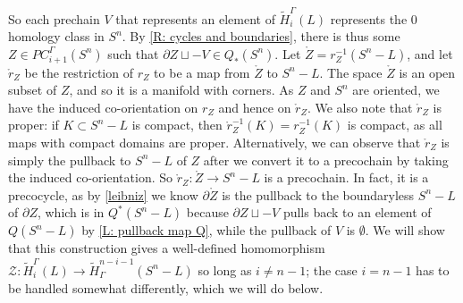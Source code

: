 \documentclass[12pt]{article}
\theoremstyle{plain}
\theoremstyle{definition}
\theoremstyle{remark}
\newcommand{\td}[1]{\tilde{#1}}
\newcommand{\mr}[1]{\mathring{#1}}
\newcommand{\bd}{\partial}
\newcommand{\mc}[1]{\mathcal{#1}}
\begin{document}
So each prechain $V$ that represents an element of $\td H_i^\Gamma(L)$ represents the $0$ homology class in $S^n$. By \cref{R: cycles and boundaries}, there is thus some $Z \in PC^\Gamma_{i+1}(S^n)$ such that $\bd Z \sqcup -V \in Q_*(S^n)$.
Let $\mr Z = r_Z^{-1}(S^n-L)$, and let $\mr r_Z$ be the restriction of $r_Z$ to be a map from $\mr Z$ to $S^n-L$.
The space $\mr Z$ is an open subset of $Z$, and so it is a manifold with corners.
As $Z$ and $S^n$ are oriented, we have the induced co-orientation on $r_Z$ and hence on $\mr r_Z$.  We also note that $\mr r_Z$ is proper: if $K \subset S^n-L$ is compact, then $\mr r_Z^{-1}(K) = r_Z^{-1}(K)$ is compact, as all maps with compact domains are proper.
Alternatively, we can observe that $\mr r_Z$ is simply the pullback to $S^n-L$ of $Z$ after we convert it to a precochain by taking the induced co-orientation.
So $\mr r_Z \colon \mr Z \to S^n - L$ is a precochain.
In fact, it is a precocycle, as by \cref{leibniz} we know $\bd{\mr Z}$ is the pullback to the boundaryless $S^n-L$ of $\bd Z$, which is in $Q^*(S^n-L)$ because $\bd Z \sqcup -V$ pulls back to an element of $Q(S^n-L)$ by \cref{L: pullback map Q}, while the pullback of $V$ is $\emptyset$.
We will show that this construction gives a well-defined homomorphism $\mc Z \colon \td H_i^\Gamma(L) \to \td H^{n-i-1}_\Gamma(S^n-L)$ so long as $i \neq n-1$; the case $i = n-1$ has to be handled somewhat differently, which we will do below.
\end{document}
